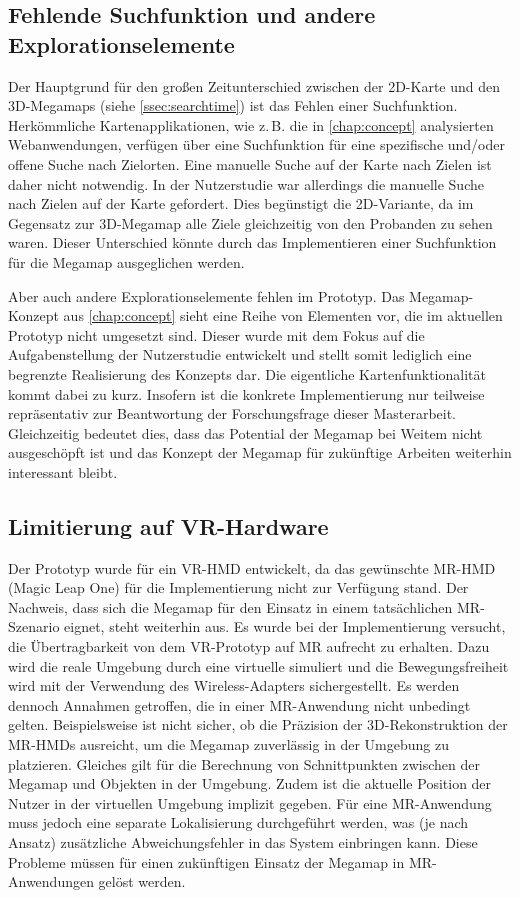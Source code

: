 \subsection*{Fehlende Suchfunktion und andere Explorationselemente}
Der Hauptgrund für den großen Zeitunterschied zwischen der 2D-Karte und den 3D-Megamaps (siehe \autoref{ssec:searchtime}) ist das Fehlen einer Suchfunktion.
Herkömmliche Kartenapplikationen, wie z.\,B. die in \autoref{chap:concept} analysierten Webanwendungen, verfügen über eine Suchfunktion für eine spezifische und/oder offene Suche nach Zielorten.
Eine manuelle Suche auf der Karte nach Zielen ist daher nicht notwendig.
In der Nutzerstudie war allerdings die manuelle Suche nach Zielen auf der Karte gefordert.
Dies begünstigt die 2D-Variante, da im Gegensatz zur 3D-Megamap alle Ziele gleichzeitig von den Probanden zu sehen waren.
Dieser Unterschied könnte durch das Implementieren einer Suchfunktion für die Megamap ausgeglichen werden.

Aber auch andere Explorationselemente fehlen im Prototyp.
Das Megamap-Konzept aus \autoref{chap:concept} sieht eine Reihe von Elementen vor, die im aktuellen Prototyp nicht umgesetzt sind.
Dieser wurde mit dem Fokus auf die Aufgabenstellung der Nutzerstudie entwickelt und stellt somit lediglich eine begrenzte Realisierung des Konzepts dar.
Die eigentliche Kartenfunktionalität kommt dabei zu kurz.
Insofern ist die konkrete Implementierung nur teilweise repräsentativ zur Beantwortung der Forschungsfrage dieser Masterarbeit.
Gleichzeitig bedeutet dies, dass das Potential der Megamap bei Weitem nicht ausgeschöpft ist und das Konzept der Megamap für zukünftige Arbeiten weiterhin interessant bleibt.

\subsection*{Limitierung auf VR-Hardware}
Der Prototyp wurde für ein VR-HMD entwickelt, da das gewünschte MR-HMD (Magic Leap One) für die Implementierung nicht zur Verfügung stand.
Der Nachweis, dass sich die Megamap für den Einsatz in einem tatsächlichen MR-Szenario eignet, steht weiterhin aus.
Es wurde bei der Implementierung versucht, die Übertragbarkeit von dem VR-Prototyp auf MR aufrecht zu erhalten.
Dazu wird die reale Umgebung durch eine virtuelle simuliert und die Bewegungsfreiheit wird mit der Verwendung des Wireless-Adapters sichergestellt.
Es werden dennoch Annahmen getroffen, die in einer MR-Anwendung nicht unbedingt gelten.
Beispielsweise ist nicht sicher, ob die Präzision der 3D-Rekonstruktion der MR-HMDs ausreicht, um die Megamap zuverlässig in der Umgebung zu platzieren.
Gleiches gilt für die Berechnung von Schnittpunkten zwischen der Megamap und Objekten in der Umgebung.
Zudem ist die aktuelle Position der Nutzer in der virtuellen Umgebung implizit gegeben.
Für eine MR-Anwendung muss jedoch eine separate Lokalisierung durchgeführt werden, was (je nach Ansatz) zusätzliche Abweichungsfehler in das System einbringen kann.
Diese Probleme müssen für einen zukünftigen Einsatz der Megamap in MR-Anwendungen gelöst werden.

